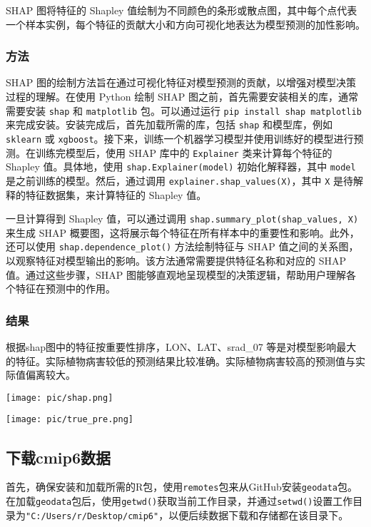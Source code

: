 \documentclass{article}
\begin{document}
SHAP 图将特征的 Shapley 值绘制为不同颜色的条形或散点图，其中每个点代表一个样本实例，每个特征的贡献大小和方向可视化地表达为模型预测的加性影响。
\subsubsection{方法}
SHAP 图的绘制方法旨在通过可视化特征对模型预测的贡献，以增强对模型决策过程的理解。在使用 Python 绘制 SHAP 图之前，首先需要安装相关的库，通常需要安装 \texttt{shap} 和 \texttt{matplotlib} 包。可以通过运行 \texttt{pip install shap matplotlib} 来完成安装。安装完成后，首先加载所需的库，包括 \texttt{shap} 和模型库，例如 \texttt{sklearn} 或 \texttt{xgboost}。接下来，训练一个机器学习模型并使用训练好的模型进行预测。在训练完模型后，使用 SHAP 库中的 \texttt{Explainer} 类来计算每个特征的 Shapley 值。具体地，使用 \texttt{shap.Explainer(model)} 初始化解释器，其中 \texttt{model} 是之前训练的模型。然后，通过调用 \texttt{explainer.shap\_values(X)}，其中 \texttt{X} 是待解释的特征数据集，来计算特征的 Shapley 值。

一旦计算得到 Shapley 值，可以通过调用 \texttt{shap.summary\_plot(shap\_values, X)} 来生成 SHAP 概要图，这将展示每个特征在所有样本中的重要性和影响。此外，还可以使用 \texttt{shap.dependence\_plot()} 方法绘制特征与 SHAP 值之间的关系图，以观察特征对模型输出的影响。该方法通常需要提供特征名称和对应的 SHAP 值。通过这些步骤，SHAP 图能够直观地呈现模型的决策逻辑，帮助用户理解各个特征在预测中的作用。


\subsubsection{结果}
根据shap图中的特征按重要性排序，LON、LAT、srad\_07 等是对模型影响最大的特征。实际植物病害较低的预测结果比较准确。实际植物病害较高的预测值与实际值偏离较大。
\par
\texttt{[image: pic/shap.png]} %
\par
\texttt{[image: pic/true\_pre.png]} %

\subsection{下载cmip6数据}
首先，确保安装和加载所需的R包，使用\texttt{remotes}包来从GitHub安装\texttt{geodata}包。在加载\texttt{geodata}包后，使用\texttt{getwd()}获取当前工作目录，并通过\texttt{setwd()}设置工作目录为\texttt{"C:/Users/r/Desktop/cmip6"}，以便后续数据下载和存储都在该目录下。
\end{document}

